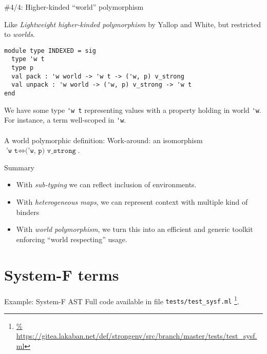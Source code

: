 \documentclass{beamer}          %
\begin{document}
\begin{frame}[fragile]{\#4/4: Higher-kinded ``world'' polymorphism}

Like {\em Lightweight higher-kinded polymorphism} by Yallop and White, but restricted to {\em worlds}.
\begin{lstlisting}
module type INDEXED = sig
  type 'w t
  type p
  val pack : 'w world -> 'w t -> ('w, p) v_strong
  val unpack : 'w world -> ('w, p) v_strong -> 'w t
end
\end{lstlisting}

We have some type \lstinline{'w t} representing values with a property holding in world
\lstinline{'w}. For instance, a term well-scoped in \lstinline{'w}. \\
\pause ~ \\
A world polymorphic definition:
\pause
Work-around: an isomorphism $\texttt{'w t} \Leftrightarrow \texttt{('w, p) v\_strong}$. \\
\end{frame}

\begin{frame}{Summary}
  \begin{itemize}
    \item With {\em sub-typing} we can reflect inclusion of environments.
    \item With {\em heterogeneous maps}, we can represent context with multiple kind
          of binders
    \item With {\em world polymorphism}, we turn this into an efficient and
          generic toolkit enforcing ``world respecting'' usage.
  \end{itemize}
\end{frame}

\section{System-F terms}

\begin{frame}{Example: System-F AST}
  Full code available in file {\tt tests/test\_sysf.ml}
  \footnote{\url{%
https://gitea.lakaban.net/def/strongenv/src/branch/master/tests/test_sysf.ml}}.

\end{frame}
\end{document}
